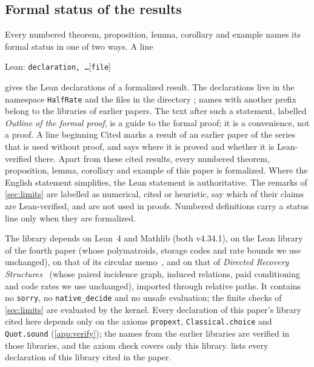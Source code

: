 \subsection{Formal status of the results}\label{sec:prelim-lean}

Every numbered theorem, proposition, lemma, corollary and example names its formal status in one of two ways. A line
\begin{center}
{\small\textsf{Lean:} \texttt{declaration, \dots}\hfill[\texttt{file}]}
\end{center}
gives the Lean declarations of a formalized result. The declarations live in the namespace \texttt{HalfRate}
and the files in the directory ; names with another prefix belong to the libraries of earlier
papers. The text after such a statement, labelled \emph{Outline of the formal proof}, is a guide to the formal proof; it
is a convenience, not a proof. A line beginning \textsf{Cited} marks a result of an earlier paper of the series that is
used without proof, and says where it is proved and whether it is Lean-verified there. Apart from these cited
results, every numbered theorem, proposition, lemma, corollary and example of this paper is formalized. Where the
English statement simplifies, the Lean statement is authoritative. The remarks of
\cref{sec:limits} are labelled as numerical, cited or heuristic, say which of their claims are Lean-verified, and are
not used in proofs. Numbered definitions carry a status line only when they are formalized.

The library depends on Lean~4 and Mathlib (both v4.34.1), on the Lean library of the fourth paper (whose
polymatroids, storage codes and rate bounds we use unchanged), on that of its circular memo~\cite{CircularMemo2026},
and on that of \emph{Directed Recovery Structures}~\cite{DirectedRecovery2026} (whose paired incidence graph, induced
relations, paid conditioning and code rates we use unchanged), imported through relative paths. It contains no
\texttt{sorry}, no \texttt{native\_decide} and no unsafe evaluation; the finite checks of \cref{sec:limits} are
evaluated by the kernel. Every declaration of this paper's library cited here depends only on the axioms
\texttt{propext}, \texttt{Classical.choice} and \texttt{Quot.sound} (\cref{app:verify}); the names from the earlier
libraries are verified in those libraries, and the axiom check  covers only this library.
 lists every declaration of this library cited in the paper.
